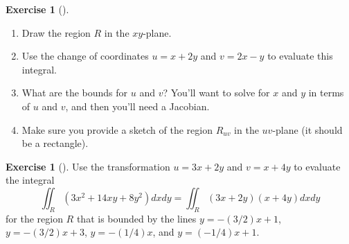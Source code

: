 \documentclass[10pt,]{book}
\theoremstyle{plain}
\theoremstyle{definition}
\theoremstyle{definition}
\theoremstyle{definition}
\theoremstyle{definition}
\newtheorem{exploration}[project]{Exercise}
\theoremstyle{definition}
\numberwithin{equation}{section}
\begin{document}
\begin{exploration}[]\label{exploration-270}
\leavevmode%
\begin{enumerate}[font=\bfseries,label=(\alph*),ref=\alph*]
\item\label{task-732} Draw the region \(R\) in the \(xy\)-plane.%
\item\label{task-733} Use the change of coordinates \(u=x+2y\) and \(v=2x-y\) to evaluate this integral.%
\item\label{task-734} What are the bounds for \(u\) and \(v\)?  You'll want to solve for \(x\) and \(y\) in terms of \(u\) and \(v\), and then you'll need a Jacobian.%
\item\label{task-735} Make sure you provide a sketch of the region \(R_{uv}\) in the \(uv\)-plane (it should be a rectangle).%
\end{enumerate}
\end{exploration}
\begin{exploration}[]\label{exploration-271}
Use the transformation \(u=3x+2y\) and \(v=x+4y\) to evaluate the integral%
\begin{equation*}
\iint_R (3x^2+14xy+8y^2)dxdy =\iint_R (3x+2y)(x+4y)dxdy
\end{equation*}
for the region \(R\) that is bounded by the lines \(y=-(3/2)x+1\), \(y=-(3/2)x+3\), \(y=-(1/4)x\), and \(y=(-1/4)x+1\).%
\end{exploration}
\typeout{************************************************}
\typeout{************************************************}
\end{document}
